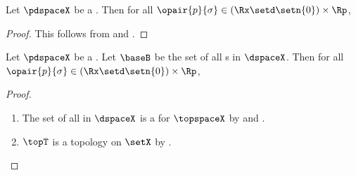 \begin{corollary}
\label{cor:tspace_openball}
Let $\pdspaceX$ be a .
Then for all $\opair{p}{\sigma}\in(\Rx\setd\setn{0})\times\Rp$,
\end{corollary}
\begin{proof}
This follows from  and .
\end{proof}

\begin{corollary}
\label{cor:tspace_base}
Let $\pdspaceX$ be a .
Let $\baseB$ be the set of all s in $\dspaceX$.
Then for all $\opair{p}{\sigma}\in(\Rx\setd\setn{0})\times\Rp$,
\end{corollary}
\begin{proof}
\begin{enumerate}
  \item The set of all  in $\dspaceX$ is a  for $\topspaceX$ by
         and .

  \item $\topT$ is a topology on $\setX$ by .
\end{enumerate}
\end{proof}

